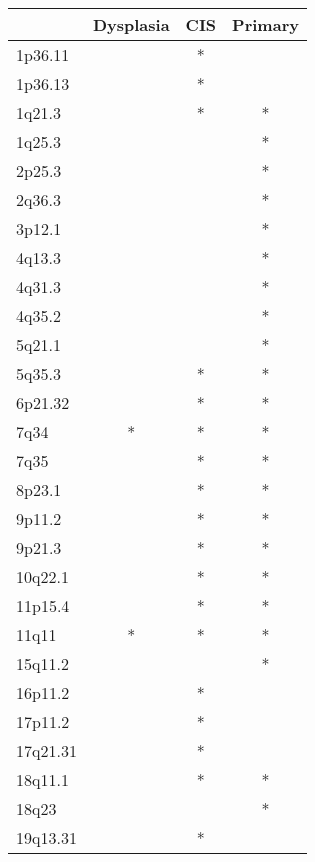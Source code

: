 \begin{tabular}{lccc}
\toprule
{} & Dysplasia & CIS & Primary \\
\midrule
1p36.11  &           &   * &         \\
1p36.13  &           &   * &         \\
1q21.3   &           &   * &       * \\
1q25.3   &           &     &       * \\
2p25.3   &           &     &       * \\
2q36.3   &           &     &       * \\
3p12.1   &           &     &       * \\
4q13.3   &           &     &       * \\
4q31.3   &           &     &       * \\
4q35.2   &           &     &       * \\
5q21.1   &           &     &       * \\
5q35.3   &           &   * &       * \\
6p21.32  &           &   * &       * \\
7q34     &         * &   * &       * \\
7q35     &           &   * &       * \\
8p23.1   &           &   * &       * \\
9p11.2   &           &   * &       * \\
9p21.3   &           &   * &       * \\
10q22.1  &           &   * &       * \\
11p15.4  &           &   * &       * \\
11q11    &         * &   * &       * \\
15q11.2  &           &     &       * \\
16p11.2  &           &   * &         \\
17p11.2  &           &   * &         \\
17q21.31 &           &   * &         \\
18q11.1  &           &   * &       * \\
18q23    &           &     &       * \\
19q13.31 &           &   * &         \\
\bottomrule
\end{tabular}
